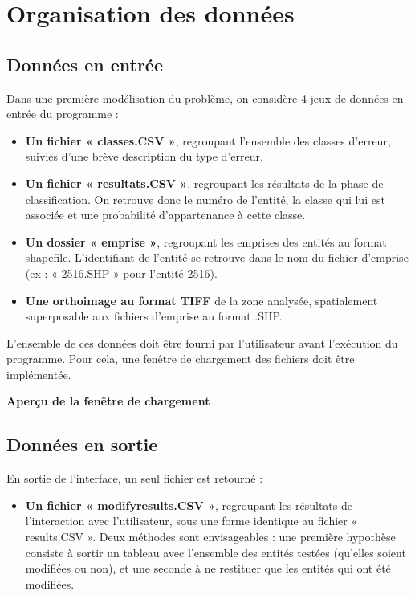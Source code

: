 \section{Organisation des données}

\subsection{Données en entrée}

Dans une première modélisation du problème, on considère 4 jeux de données en entrée du programme :
\begin{itemize}[label=$\rightarrow$]
	\item \textbf{Un fichier « classes.CSV »}, regroupant l’ensemble des classes d’erreur, suivies d’une brève description du type d’erreur.
	\item \textbf{Un fichier « resultats.CSV »}, regroupant les résultats de la phase de classification. On retrouve donc le numéro de l’entité, la classe qui lui est associée et une probabilité d’appartenance à cette classe.
	\item \textbf{Un dossier « emprise »}, regroupant les emprises des entités au format shapefile. L’identifiant de l’entité se retrouve dans le nom du fichier d'emprise (ex : « 2516.SHP » pour l’entité 2516).
	\item \textbf{Une orthoimage au format TIFF} de la zone analysée, spatialement superposable aux fichiers d’emprise au format .SHP.\newline
\end{itemize}


L’ensemble de ces données doit être fourni par l’utilisateur avant l’exécution du programme. Pour cela, une fenêtre de chargement des fichiers doit être implémentée. \newline

\textbf{Aperçu de la fenêtre de chargement}

\subsection{Données en sortie}

En sortie de l'interface, un seul fichier est retourné :
\begin{itemize}[label=$\rightarrow$]
	\item \textbf{Un fichier « modifyresults.CSV »}, regroupant les résultats de l'interaction avec l'utilisateur, sous une forme identique au fichier « results.CSV ». Deux méthodes sont envisageables : une première hypothèse consiste à sortir un tableau avec l'ensemble des entités testées (qu'elles soient modifiées ou non), et une seconde à ne restituer que les entités qui ont été modifiées.\newline
\end{itemize}


